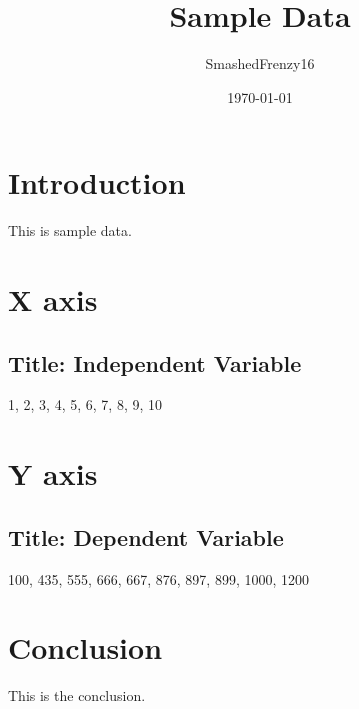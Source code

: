 \documentclass[a4paper, 12pt]{article}
\begin{document}
\title{Sample Data}
\author{SmashedFrenzy16}
\date{\today}
\maketitle


\section{Introduction}

This is sample data.

\section{X axis}

\subsection{Title: Independent Variable}

1, 2, 3, 4, 5, 6, 7, 8, 9, 10

\section{Y axis}

\subsection{Title: Dependent Variable}

100, 435, 555, 666, 667, 876, 897, 899, 1000, 1200

\section{Conclusion}

This is the conclusion.
\end{document}
